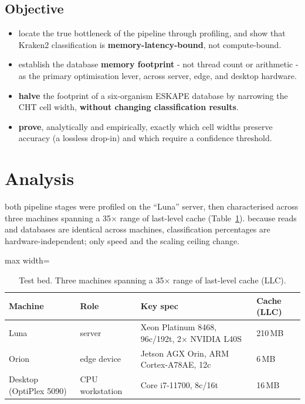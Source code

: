 \documentclass[10.5pt]{article}
\begin{document}
\subsection{Objective}
\begin{itemize}[nosep,leftmargin=1.4em]
  \item locate the true bottleneck of the pipeline through profiling, and show that Kraken2 classification is \textbf{memory-latency-bound}, not compute-bound.
  \item establish the database \textbf{memory footprint} - not thread count or arithmetic - as the primary optimisation lever, across server, edge, and desktop hardware.
  \item \textbf{halve} the footprint of a six-organism ESKAPE database by narrowing the CHT cell width, \textbf{without changing classification results}.
  \item \textbf{prove}, analytically and empirically, exactly which cell widths preserve accuracy (a lossless drop-in) and which require a confidence threshold.
\end{itemize}

\section{Analysis}

both pipeline stages were profiled on the ``Luna'' server, then characterised across three machines spanning a 35$\times$ range of last-level cache (Table~\ref{tab:testbed}). because reads and databases are identical across machines, classification percentages are hardware-independent; only speed and the scaling ceiling change.

\begin{table}[h!]
\centering\footnotesize
\caption{Test bed. Three machines spanning a 35$\times$ range of last-level cache (LLC).}
\label{tab:testbed}
\begin{adjustbox}{max width=\textwidth}
\begin{tabular}{@{}llll@{}}
\toprule
\textbf{Machine} & \textbf{Role} & \textbf{Key spec} & \textbf{Cache (LLC)} \\
\midrule
Luna & server & Xeon Platinum 8468, 96c/192t, 2$\times$ NVIDIA L40S & 210\,MB \\
Orion & edge device & Jetson AGX Orin, ARM Cortex-A78AE, 12c & 6\,MB \\
Desktop (OptiPlex 5090) & CPU workstation & Core i7-11700, 8c/16t & 16\,MB \\
\bottomrule
\end{tabular}
\end{adjustbox}
\end{table}
\end{document}
